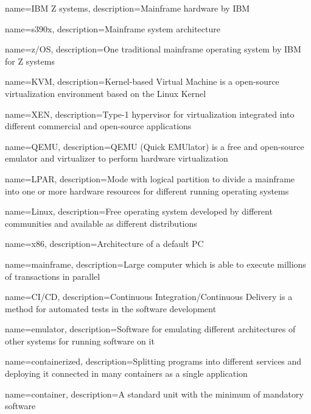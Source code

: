 {
    name={IBM Z systems},
    description={Mainframe hardware by IBM}
}

{
    name={s390x},
    description={Mainframe system architecture}
}

{
    name={z/OS},
    description={One traditional mainframe operating system by IBM for Z systems}
}

{
    name={KVM},
    description={Kernel-based Virtual Machine is a open-source virtualization environment based on the Linux Kernel}
}

{
    name={XEN},
    description={Type-1 hypervisor for virtualization integrated into different commercial and open-source applications}
}

{
    name={QEMU},
    description={QEMU (Quick EMUlator) is a free and open-source emulator and virtualizer to perform hardware virtualization}
}

{
    name={LPAR},
    description={Mode with logical partition to divide a mainframe into one or more hardware resources for different running operating systems}
}

{
    name={Linux},
    description={Free operating system developed by different communities and available as different distributions}
}

{
    name={x86},
    description={Architecture of a default PC}
}


{
    name={mainframe},
    description={Large computer which is able to execute millions of transactions in parallel}
}


{
    name={CI/CD},
    description={Continuous Integration/Continuous Delivery is a method for automated tests in the software development}
}

{
    name={emulator},
    description={Software for emulating different architectures of other systems for running software on it}
}

{
    name={containerized},
    description={Splitting programs into different services and deploying it connected in many containers as a single application}
}

{
    name={container},
    description={A standard unit with the minimum of mandatory software}
}

